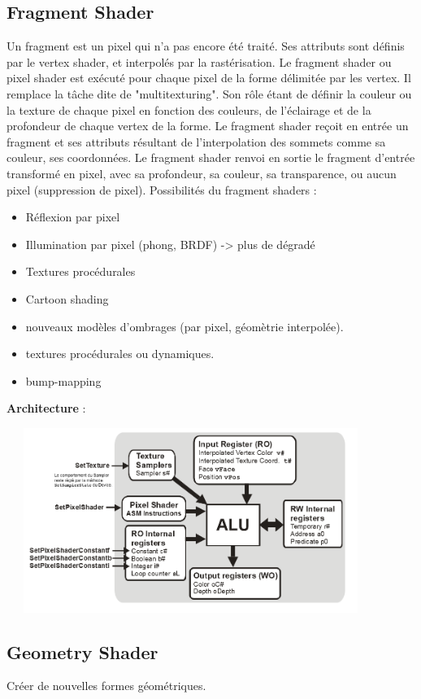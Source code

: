 \subsection{Fragment Shader}
Un fragment est un pixel qui n’a pas encore été traité. Ses attributs sont définis par le vertex shader, et interpolés par la rastérisation.
Le fragment shader ou pixel shader est exécuté pour chaque pixel de la forme délimitée par les vertex. Il remplace la tâche dite de "multitexturing". Son rôle étant de définir la couleur ou la texture de chaque pixel en fonction des couleurs, de l’éclairage et de la profondeur de chaque vertex de la forme.
Le fragment shader reçoit en entrée un fragment et ses attributs résultant de l’interpolation des sommets comme sa couleur, ses coordonnées.
Le fragment shader renvoi en sortie le fragment d’entrée transformé en pixel, avec sa profondeur, sa couleur, sa transparence, ou aucun pixel (suppression de pixel).
Possibilités du fragment shaders :
\begin{itemize}
	\item Réflexion par pixel
	\item Illumination par pixel (phong, BRDF) -> plus de dégradé
	\item Textures procédurales
	\item Cartoon shading
	\item nouveaux modèles d’ombrages (par pixel, géomètrie interpolée).
	\item textures procédurales ou dynamiques.
	\item bump-mapping
\end{itemize}
\textbf{Architecture} :
\\
\begin{center}
\includegraphics[width=12cm,height=60mm]{leo/images/ArchiPixel.png}
\end{center}

\subsection{Geometry Shader}
Créer de nouvelles formes géométriques.
\\

